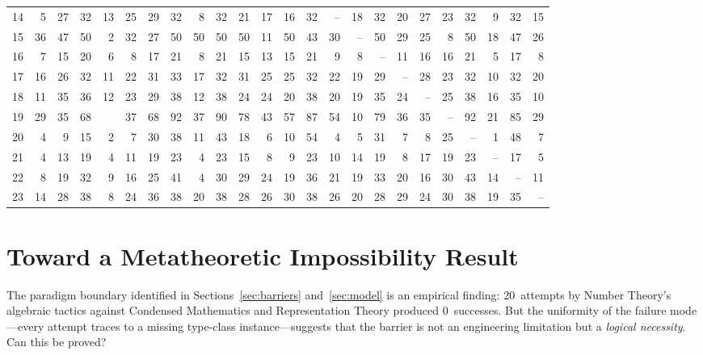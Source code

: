 \documentclass[11pt]{article}
\theoremstyle{definition}
\theoremstyle{remark}
\begin{document}
\begin{landscape}
\begin{table}[p]
{\begin{tabular}{@{}r|rrrrrrrrrrrrrrrrrrrrrrr@{}}
14 & 5 & 27 & 32 & 13 & 25 & 29 & 32 & 8 & 32 & 21 & 17 & 16 & 32 & -- & 18 & 32 & 20 & 27 & 23 & 32 & 9 & 32 & 15 \\
15 & 36 & 47 & 50 & 2 & 32 & 27 & 50 & 50 & 50 & 50 & 11 & 50 & 43 & 30 & -- & 50 & 29 & 25 & 8 & 50 & 18 & 47 & 26 \\
16 & 7 & 15 & 20 & 6 & 8 & 17 & 21 & 8 & 21 & 15 & 13 & 15 & 21 & 9 & 8 & -- & 11 & 16 & 16 & 21 & 5 & 17 & 8 \\
17 & 16 & 26 & 32 & 11 & 22 & 31 & 33 & 17 & 32 & 31 & 25 & 25 & 32 & 22 & 19 & 29 & -- & 28 & 23 & 32 & 10 & 32 & 20 \\
18 & 11 & 35 & 36 & 12 & 23 & 29 & 38 & 12 & 38 & 24 & 24 & 20 & 38 & 20 & 19 & 35 & 24 & -- & 25 & 38 & 16 & 35 & 10 \\
19 & 29 & 35 & 68 & & 37 & 68 & 92 & 37 & 90 & 78 & 43 & 57 & 87 & 54 & 10 & 79 & 36 & 35 & -- & 92 & 21 & 85 & 29 \\
20 & 4 & 9 & 15 & 2 & 7 & 30 & 38 & 11 & 43 & 18 & 6 & 10 & 54 & 4 & 5 & 31 & 7 & 8 & 25 & -- & 1 & 48 & 7 \\
21 & 4 & 13 & 19 & 4 & 11 & 19 & 23 & 4 & 23 & 15 & 8 & 9 & 23 & 10 & 14 & 19 & 8 & 17 & 19 & 23 & -- & 17 & 5 \\
22 & 8 & 19 & 32 & 9 & 16 & 25 & 41 & 4 & 30 & 29 & 24 & 19 & 36 & 21 & 19 & 33 & 20 & 16 & 30 & 43 & 14 & -- & 11 \\
23 & 14 & 28 & 38 & 8 & 24 & 36 & 38 & 20 & 38 & 28 & 26 & 30 & 38 & 26 & 20 & 28 & 29 & 24 & 30 & 38 & 19 & 35 & -- \\
\bottomrule
\end{tabular}
}
\end{table}
\end{landscape}

\section{Toward a Metatheoretic Impossibility Result}%
\label{sec:metatheory}

The paradigm boundary identified in Sections~\ref{sec:barriers}
and~\ref{sec:model} is an empirical finding: 20~attempts by Number
Theory's algebraic tactics against Condensed Mathematics and
Representation Theory produced 0~successes.  But the uniformity of
the failure mode---every attempt traces to a missing type-class
instance---suggests that the barrier is not an engineering limitation
but a \emph{logical necessity}.  Can this be proved?
\end{document}
